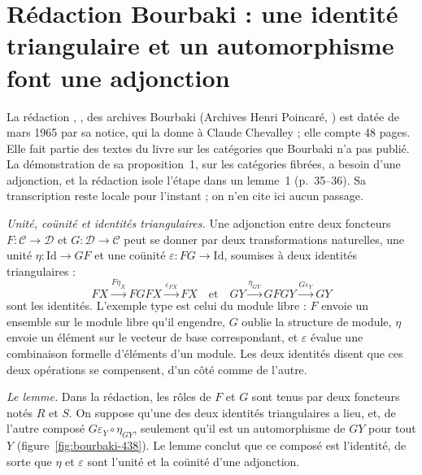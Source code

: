 \section[Rédaction Bourbaki \redac{438} : une identité triangulaire suffit]{Rédaction Bourbaki  : une identité triangulaire et un automorphisme font une adjonction\protect{}}\label{sec:bourbaki-438}

La rédaction , , des archives Bourbaki (Archives Henri Poincaré, ) est datée de mars 1965 par sa notice, qui la donne à Claude Chevalley ; elle compte 48 pages. Elle fait partie des textes du livre sur les catégories que Bourbaki n'a pas publié. La démonstration de sa proposition~1, sur les catégories fibrées, a besoin d'une adjonction, et la rédaction isole l'étape dans un lemme~1 (p.~35--36). Sa transcription reste locale pour l'instant ; on n'en cite ici aucun passage.

\emph{Unité, coünité et identités triangulaires.} Une adjonction entre deux foncteurs $F : \mathcal C \to \mathcal D$ et $G : \mathcal D \to \mathcal C$ peut se donner par deux transformations naturelles, une unité $\eta : \mathrm{Id} \to GF$ et une coünité $\varepsilon : FG \to \mathrm{Id}$, soumises à deux identités triangulaires :
\[
F X \xrightarrow{F\eta_X} FGF X \xrightarrow{\varepsilon_{FX}} F X \quad\text{et}\quad G Y \xrightarrow{\eta_{GY}} GFG Y \xrightarrow{G\varepsilon_Y} G Y
\]
sont les identités. L'exemple type est celui du module libre : $F$ envoie un ensemble sur le module libre qu'il engendre, $G$ oublie la structure de module, $\eta$ envoie un élément sur le vecteur de base correspondant, et $\varepsilon$ évalue une combinaison formelle d'éléments d'un module. Les deux identités disent que ces deux opérations se compensent, d'un côté comme de l'autre.

\emph{Le lemme.} Dans la rédaction, les rôles de $F$ et $G$ sont tenus par deux foncteurs notés $R$ et $S$. On suppose qu'une des deux identités triangulaires a lieu, et, de l'autre composé $G\varepsilon_Y \circ \eta_{GY}$, seulement qu'il est un automorphisme de $GY$ pour tout $Y$ (figure~\ref{fig:bourbaki-438}). Le lemme conclut que ce composé est l'identité, de sorte que $\eta$ et $\varepsilon$ sont l'unité et la coünité d'une adjonction.

